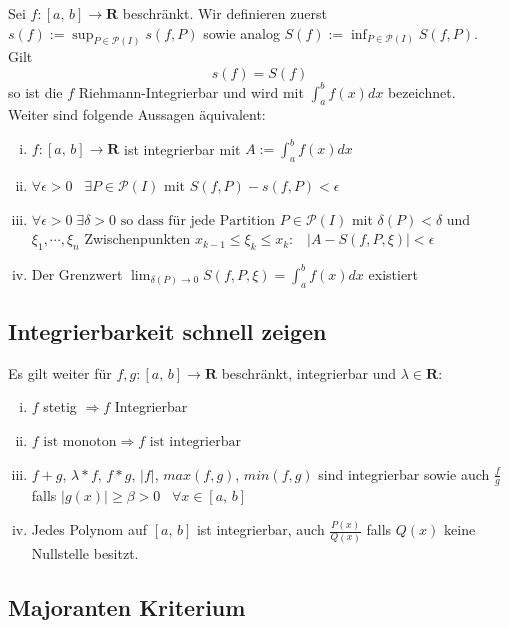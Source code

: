 \documentclass[8pt]{article}
\begin{document}
\begin{multicols*}{3}
Sei $f:[a,\,b] \rightarrow \mathbf{R}$ beschränkt. Wir definieren zuerst $s(f) := \sup_{P \in \mathcal{P}(I)} s(f, P)$ sowie analog $S(f) := \inf_{P \in \mathcal{P}(I)} S(f, P)$.\\
Gilt
$$
  s(f) = S(f)
$$
so ist die $f$ Riehmann-Integrierbar und wird mit $\int_a^b f(x)dx$ bezeichnet.\\
Weiter sind folgende Aussagen äquivalent:
\begin{enumerate}[(i)]
  \item $f:[a,\, b]\rightarrow \mathbf{R}$ ist integrierbar mit $A := \int_a^b f(x) dx$
  \item $\forall \epsilon > 0 \;\;\; \exists P \in \mathcal{P}(I) \text{ mit } S(f, P) - s(f, P) < \epsilon$
  \item $\forall \epsilon > 0 \; \exists \delta > 0 \text{ so dass für jede Partition } P \in \mathcal{P}(I) $ mit $ \delta(P) < \delta $ und $ \xi_1, \cdots, \xi_n $ Zwischenpunkten $x_{k-1} \leq \xi_k \leq x_k:\;\;\; |A - S(f, P, \xi)| < \epsilon$
  \item Der Grenzwert $\lim_{\delta(P) \rightarrow 0} S(f, P, \xi) = \int_a^b f(x)dx$ existiert
\end{enumerate}

\subsection{Integrierbarkeit schnell zeigen}

Es gilt weiter für $f,g:[a,\,b] \rightarrow \mathbf{R}$ beschränkt, integrierbar und $\lambda \in \mathbf{R}$:
\begin{enumerate}[(i)]
  \item $f$ stetig $\Rightarrow f$ Integrierbar
  \item $f\text{ ist monoton} \Rightarrow f \text{ ist integrierbar}$
  \item $f + g$, $\lambda * f$, $f * g$, $|f|$, $max(f, g)$, $min(f, g)$ sind integrierbar sowie auch $\frac{f}{g}$ falls $|g(x)| \geq \beta > 0 \;\;\; \forall x \in [a,\,b]$
  \item Jedes Polynom auf $[a,\, b]$ ist integrierbar, auch $\frac{P(x)}{Q(x)}$ falls $Q(x)$ keine Nullstelle besitzt.
\end{enumerate}

\subsection{Majoranten Kriterium}


\end{multicols*}
\end{document}

